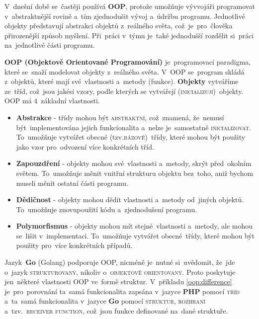 \documentclass[14pt,a4paper]{article}
\begin{document}
        V~dnešní době se~častěji používá \textbf{OOP}, protože umožňuje vývvojáři programovat v~abstraktnější rovině a~tím zjednodušit vývoj a~údržbu programu. Jednotlivé objekty představují abstrakci objektů z~reálného světa, což~je~pro~člověka přirozenější způsob myšlení. Při~práci v~týmu je~také jednodušší rozdělit si~práci na~jednotlivé části programu.
        
        \textbf{OOP (Objektově Orientované Programování)} je~programovací paradigma, které se~snaží modelovat objekty z~reálného světa. V~OOP se~program skládá z~objektů, které mají své~vlastnosti a~metody (funkce). \textbf{Objekty} vytváříme ze~tříd, což~jsou jakési vzory, podle kterých se vytvářejí (\textsc{inicializují})~objekty. \textsc{OOP} má 4~základní vlastnosti.
        \begin{itemize}
            \item \textbf{Abstrakce} - třídy mohou být \textsc{abstraktní}, což~znamená, že~nemusí být~implementována jejich funkcionalita a~nelze je~samostatně \textsc{inicializovat}. To~umožňuje vytvářet obecné (tzv.\textsc{bázové})~třídy, které mohou být použity jako vzor pro~odvození více konkrétních tříd.
            \item \textbf{Zapouzdření} - objekty mohou své~vlastnosti a~metody, skrýt před~okolním světem. To~umožňuje měnit vnitřní strukturu objektu bez~toho, aniž bychom museli měnit ostatní části programu.
            \item \textbf{Dědičnost} - objekty mohou dědit vlastnosti a~metody od~jiných objektů. To~umožňuje znovupoužití kódu a~zjednodušení programu.
            \item \textbf{Polymorfismus} - objekty mohou mít stejné~vlastnosti a~metody, ale mohou se~lišit v~implementaci. To~umožňuje vytvářet obecné~třídy, které mohou být použity pro~více konkrétních případů.
        \end{itemize} \parencite{Keogh:OOP}

        Jazyk~\textbf{Go} (Golang) podporuje OOP, nicméně je~nutné si~uvědomit, že~jde o~jazyk \textsc{strukturovaný}, nikoliv o~\textsc{objektově orientovaný}. Proto poskytuje jen~některé vlastnosti OOP ve~formě struktur. \parencite{go:OOP}
        V~příkladu \ref{oop:difference} je~pro~porovnání ta~samá funkcionalita zapsána v~jazyce \textbf{PHP} pomocí \textsc{tříd} a~ta~samá funkcionalita v~jazyce \textbf{Go} pomocí \textsc{struktur}, \textsc{rozhraní} a~tzv.~\textsc{receiver function}, což~jsou funkce definované na~dané struktuře.
\end{document}
